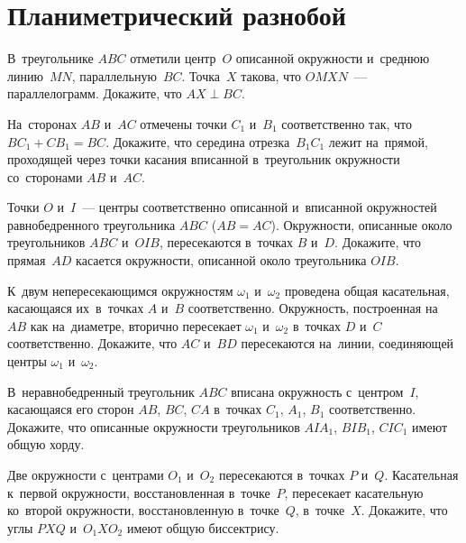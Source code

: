 
\section*{Планиметрический разнобой}


\begin{problems}

\item
В~треугольнике $ABC$ отметили центр~$O$ описанной окружности
и~среднюю линию~$MN$, параллельную~$BC$.
Точка~$X$ такова, что $OMXN$~— параллелограмм.
Докажите, что $AX \perp BC$.

\item
На~сторонах $AB$ и~$AC$ отмечены точки $C_1$ и~$B_1$ соответственно так, что
$B C_1 + C B_1 = BC$.
Докажите, что середина отрезка~$B_1 C_1$ лежит на~прямой, проходящей через
точки касания вписанной в~треугольник окружности со~сторонами $AB$ и~$AC$.

\item
Точки $O$ и~$I$~— центры соответственно описанной и~вписанной окружностей
равнобедренного треугольника $ABC$ ($AB = AC$).
Окружности, описанные около треугольников $ABC$ и~$OIB$, пересекаются в~точках
$B$ и~$D$.
Докажите, что прямая~$AD$ касается окружности, описанной около
треугольника $OIB$.

\item
К~двум непересекающимся окружностям $\omega_1$ и~$\omega_2$ проведена общая
касательная, касающаяся их~в~точках $A$ и~$B$ соответственно.
Окружность, построенная на~$AB$ как на~диаметре, вторично пересекает $\omega_1$
и~$\omega_2$ в~точках $D$ и~$C$ соответственно.
Докажите, что $AC$ и~$BD$ пересекаются на~линии, соединяющей центры $\omega_1$
и~$\omega_2$.

\item
В~неравнобедренный треугольник $ABC$ вписана окружность с~центром~$I$,
касающаяся его сторон $AB$, $BC$, $CA$ в~точках $C_1$, $A_1$, $B_1$
соответственно.
Докажите, что описанные окружности треугольников
$A I A_1$, $B I B_1$, $C I C_1$ имеют общую хорду.

\item
Две окружности с~центрами $O_1$ и~$O_2$ пересекаются в~точках $P$ и~$Q$.
Касательная к~первой окружности, восстановленная в~точке~$P$, пересекает
касательную ко~второй окружности, восстановленную в~точке~$Q$, в~точке~$X$.
Докажите, что углы $PXQ$ и~$O_1 X O_2$ имеют общую биссектрису.


\end{problems}
